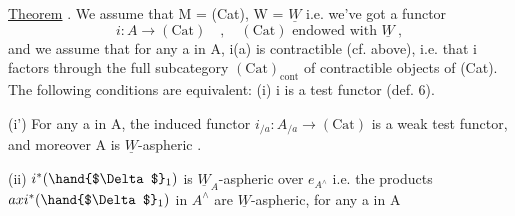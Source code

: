 \uline{Theorem} . We assume that M = (Cat), W = $\underline{W}$ i.e. we've got a functor
\[ i: A \longrightarrow (\mathrm{Cat}) \quad , \quad (\mathrm{Cat}) \text{ endowed with } \underline{W} \ , \]
and we assume that for any a in A, i(a) is contractible (cf. above), i.e.
that i factors through the full subcategory $(\mathrm{Cat})_{\mathrm{cont}}$ of contractible
objects of (Cat). The following conditions are equivalent:
(i) i is a test functor (def. 6).

(i') For any a in A, the induced functor $i_{/a} : A_{/a} \longrightarrow (\mathrm{Cat})$ is a
weak test functor, and moreover A is $\underline{W}$-aspheric .

(ii) $i^*(\hand{$\Delta$}_1)$ is $\underline{W}_A$-aspheric over $e_{A^{\wedge}}$ i.e. the products $axi^*(\hand{$\Delta$}_1)$
in $A^{\wedge}$ are $\underline{W}$-aspheric, for any a in A

